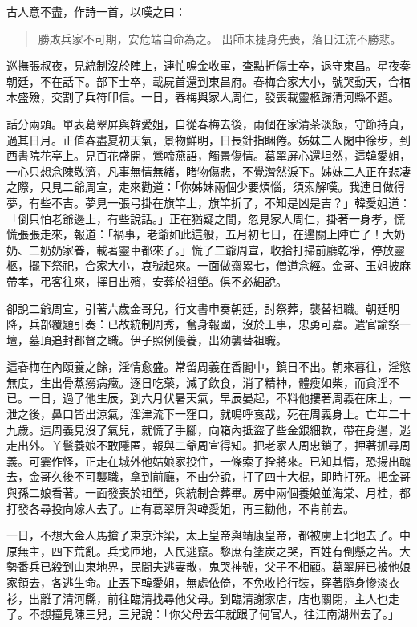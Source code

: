 古人意不盡，作詩一首，以嘆之曰：
\begin{quote}
勝敗兵家不可期，安危端自命為之。
出師未捷身先喪，落日江流不勝悲。
\end{quote}

巡撫張叔夜，見統制沒於陣上，連忙鳴金收軍，查點折傷士卒，退守東昌。星夜奏朝廷，不在話下。部下士卒，載屍首還到東昌府。春梅合家大小，號哭動天，合棺木盛殮，交割了兵符印信。一日，春梅與家人周仁，發喪載靈柩歸清河縣不題。

話分兩頭。單表葛翠屏與韓愛姐，自從春梅去後，兩個在家清茶淡飯，守節持貞，過其日月。正值春盡夏初天氣，景物鮮明，日長針指睏倦。姊妹二人閑中徐步，到西書院花亭上。見百花盛開，鶯啼燕語，觸景傷情。葛翠屏心還坦然，這韓愛姐，一心只想念陳敬濟，凡事無情無緒，睹物傷悲，不覺潸然淚下。姊妹二人正在悲凄之際，只見二爺周宣，走來勸道：「你姊妹兩個少要煩惱，須索解嘆。我連日做得夢，有些不吉。夢見一張弓掛在旗竿上，旗竿折了，不知是凶是吉？」韓愛姐道：「倒只怕老爺邊上，有些說話。」正在猶疑之間，忽見家人周仁，掛著一身孝，慌慌張張走來，報道：「禍事，老爺如此這般，五月初七日，在邊關上陣亡了！大奶奶、二奶奶家眷，載著靈車都來了。」慌了二爺周宣，收拾打掃前廳乾凈，停放靈柩，擺下祭祀，合家大小，哀號起來。一面做齋累七，僧道念經。金哥、玉姐披麻帶孝，弔客往來，擇日出殯，安葬於祖塋。俱不必細說。

卻說二爺周宣，引著六歲金哥兒，行文書申奏朝廷，討祭葬，襲替祖職。朝廷明降，兵部覆題引奏：已故統制周秀，奮身報國，沒於王事，忠勇可嘉。遣官諭祭一壇，墓頂追封都督之職。伊子照例優養，出幼襲替祖職。

這春梅在內頤養之餘，淫情愈盛。常留周義在香閣中，鎮日不出。朝來暮往，淫慾無度，生出骨蒸癆病癥。逐日吃藥，減了飲食，消了精神，體瘦如柴，而貪淫不已。一日，過了他生辰，到六月伏暑天氣，早辰晏起，不料他摟著周義在床上，一泄之後，鼻口皆出涼氣，淫津流下一窪口，就鳴呼哀哉，死在周義身上。亡年二十九歲。這周義見沒了氣兒，就慌了手腳，向箱內抵盜了些金銀細軟，帶在身邊，逃走出外。丫鬟養娘不敢隱匿，報與二爺周宣得知。把老家人周忠鎖了，押著抓尋周義。可霎作怪，正走在城外他姑娘家投住，一條索子拴將來。已知其情，恐揚出醜去，金哥久後不可襲職，拿到前廳，不由分說，打了四十大棍，即時打死。把金哥與孫二娘看著。一面發喪於祖塋，與統制合葬畢。房中兩個養娘並海棠、月桂，都打發各尋投向嫁人去了。止有葛翠屏與韓愛姐，再三勸他，不肯前去。

一日，不想大金人馬搶了東京汴梁，太上皇帝與靖康皇帝，都被虜上北地去了。中原無主，四下荒亂。兵戈匝地，人民逃竄。黎庶有塗炭之哭，百姓有倒懸之苦。大勢番兵已殺到山東地界，民間夫逃妻散，鬼哭神號，父子不相顧。葛翠屏已被他娘家領去，各逃生命。止丟下韓愛姐，無處依倚，不免收拾行裝，穿著隨身慘淡衣衫，出離了清河縣，前往臨清找尋他父母。到臨清謝家店，店也關閉，主人也走了。不想撞見陳三兒，三兒說：「你父母去年就跟了何官人，往江南湖州去了。」

